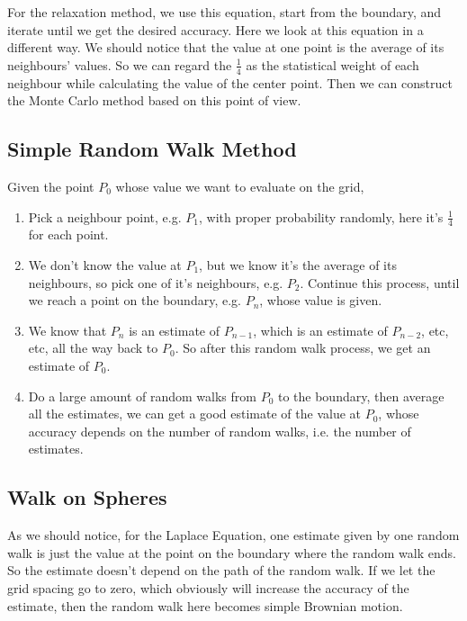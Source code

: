 \documentclass[aps, prl, reprint, groupedaddress]{revtex4-1}
\begin{document}
For the relaxation method, we use this equation, start from the boundary, and iterate until we get the desired accuracy. Here we look at this equation in a different way. We should notice that the value at one point is the average of its neighbours' values. So we can regard the $\frac{1}{4}$ as the statistical weight of each neighbour while calculating the value of the center point. Then we can construct the Monte Carlo method based on this point of view.

\subsection{Simple Random Walk Method}

Given the point $P_0$ whose value we want to evaluate on the grid,
\begin{enumerate}
    \item Pick a neighbour point, e.g. $P_1$, with proper probability randomly, here it's $\frac{1}{4}$ for each point.
    \item We don't know the value at $P_1$, but we know it's the average of its neighbours, so pick one of it's neighbours, e.g. $P_2$. Continue this process, until we reach a point on the boundary, e.g. $P_n$, whose value is given.
    \item We know that $P_n$ is an estimate of $P_{n-1}$, which is an estimate of $P_{n-2}$, etc, etc, all the way back to $P_0$. So after this random walk process, we get an estimate of $P_0$.
    \item Do a large amount of random walks from $P_0$ to the boundary, then average all the estimates, we can get a good estimate of the value at $P_0$, whose accuracy depends on the number of random walks, i.e. the number of estimates.
\end{enumerate}


\subsection{Walk on Spheres}

As we should notice, for the Laplace Equation, one estimate given by one random walk is just the value at the point on the boundary where the random walk ends. So the estimate doesn't depend on the path of the random walk. If we let the grid spacing go to zero, which obviously will increase the accuracy of the estimate, then the random walk here becomes simple Brownian motion.
\end{document}

